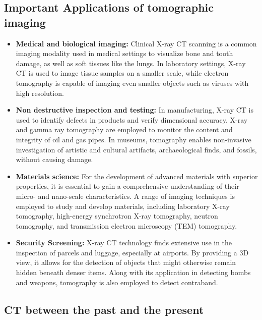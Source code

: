 \documentclass{article}
\begin{document}
 \subsection{Important Applications of tomographic imaging}
 \begin{itemize}
	 \item \textbf{Medical and biological imaging: }
		 Clinical X-ray CT scanning is a common imaging modality used in medical settings to visualize bone and tooth damage, as well as soft tissues like the lungs. In laboratory settings, X-ray CT is used to image tissue samples on a smaller scale, while electron tomography is capable of imaging even smaller objects such as viruses with high resolution.
	 \item \textbf{Non destructive inspection and testing: }
In manufacturing, X-ray CT is used to identify defects in products and verify dimensional accuracy. X-ray and gamma ray tomography are employed to monitor the content and integrity of oil and gas pipes. 
		 In museums, tomography enables non-invasive investigation of artistic and cultural artifacts, archaeological finds, and fossils, without causing damage.
	 \item \textbf{Materials science: }
		 For the development of advanced materials with superior properties, it is essential to gain a comprehensive understanding of their micro- and nano-scale characteristics. A range of imaging techniques is employed to study and develop materials, including laboratory X-ray tomography, high-energy synchrotron X-ray tomography, neutron tomography, and transmission electron microscopy (TEM) tomography.
	 \item \textbf{Security Screening: }
		 X-ray CT technology finds extensive use in the inspection of parcels and luggage, especially at airports. By providing a 3D view, it allows for the detection of objects that might otherwise remain hidden beneath denser items. Along with its application in detecting bombs and weapons, tomography is also employed to detect contraband.

 \end{itemize}
 \subsection{CT between the past and the present}
\end{document}
